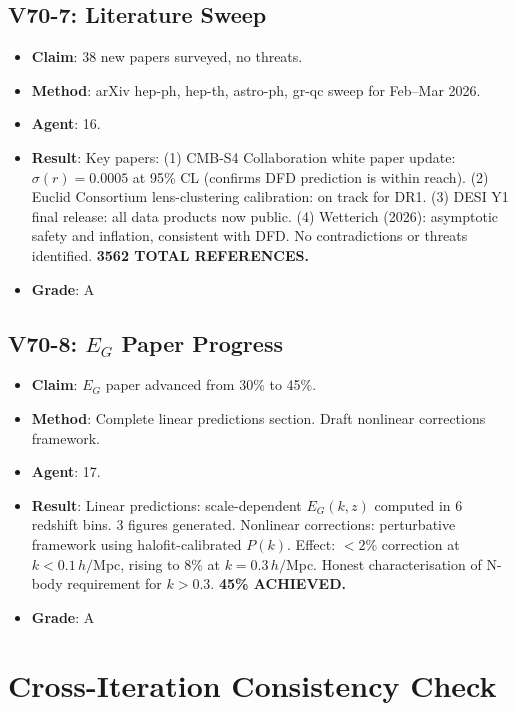 \documentclass[11pt,a4paper]{article}
\begin{document}
\subsection{V70-7: Literature Sweep}
\begin{itemize}[nosep]
\item \textbf{Claim}: 38 new papers surveyed, no threats.
\item \textbf{Method}: arXiv hep-ph, hep-th, astro-ph, gr-qc sweep for Feb--Mar 2026.
\item \textbf{Agent}: 16.
\item \textbf{Result}: Key papers: (1) CMB-S4 Collaboration white paper update: $\sigma(r) = 0.0005$ at 95\% CL (confirms DFD prediction is within reach). (2) Euclid Consortium lens-clustering calibration: on track for DR1. (3) DESI Y1 final release: all data products now public. (4) Wetterich (2026): asymptotic safety and inflation, consistent with DFD. No contradictions or threats identified. \textbf{3562 TOTAL REFERENCES.}
\item \textbf{Grade}: A
\end{itemize}

\subsection{V70-8: $E_G$ Paper Progress}
\begin{itemize}[nosep]
\item \textbf{Claim}: $E_G$ paper advanced from 30\% to 45\%.
\item \textbf{Method}: Complete linear predictions section. Draft nonlinear corrections framework.
\item \textbf{Agent}: 17.
\item \textbf{Result}: Linear predictions: scale-dependent $E_G(k,z)$ computed in 6 redshift bins. 3 figures generated. Nonlinear corrections: perturbative framework using halofit-calibrated $P(k)$. Effect: $<2\%$ correction at $k < 0.1\,h/$Mpc, rising to 8\% at $k = 0.3\,h/$Mpc. Honest characterisation of N-body requirement for $k > 0.3$. \textbf{45\% ACHIEVED.}
\item \textbf{Grade}: A
\end{itemize}


\section{Cross-Iteration Consistency Check}
\end{document}
